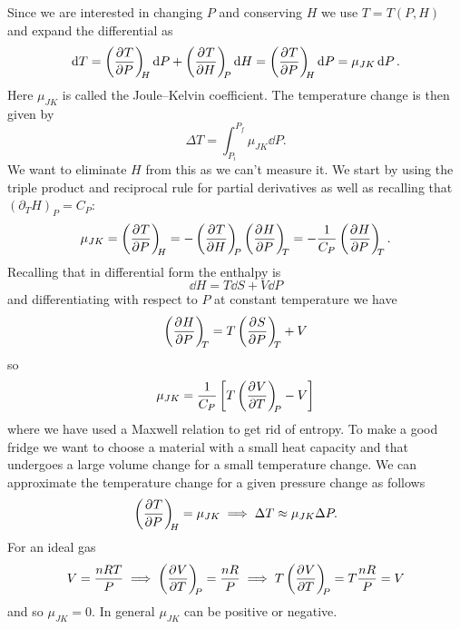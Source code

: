     Since we are interested in changing \(P\) and conserving \(H\) we use \(T = T(P, H)\) and expand the differential as
    \[\dd{T} = \left(\pdv[]{T}{P}\right)_{\!\!{H}}\dd{P} + \left(\pdv[]{T}{H}\right)_{\!\!{P}}\dd{H} = \left(\pdv[]{T}{P}\right)_{\!\!{H}}\dd{P} = \mu_{JK}\dd{P}.\]
    Here \(\mu_{JK}\) is called the Joule--Kelvin coefficient.
    The temperature change is then given by
    \[\Delta T = \int_{P_i}^{P_f}\mu_{JK}\dd{P}.\]
    We want to eliminate \(H\) from this as we can't measure it.
    We start by using the triple product and reciprocal rule for partial derivatives as well as recalling that \((\partial_TH)_P = C_P\):
    \[\mu_{JK} = \pdvconst{T}{P}{H} = -\pdvconst{T}{H}{P}\pdvconst{H}{P}{T} = -\frac{1}{C_P}\pdvconst{H}{P}{T}.\]
    Recalling that in differential form the enthalpy is
    \[\dd{H} = T\dd{S} + V\dd{P}\]
    and differentiating with respect to \(P\) at constant temperature we have
    \[\left(\pdv[]{H}{P}\right)_{\!\!{T}} = T\left(\pdv[]{S}{P}\right)_{\!\!{T}} + V\]
    so
    \[\mu_{JK} = \frac{1}{C_P}\left[T\left(\pdv[]{V}{T}\right)_{\!\!{P}} - V\right]\]
    where we have used a Maxwell relation to get rid of entropy.
    To make a good fridge we want to choose a material with a small heat capacity and that undergoes a large volume change for a small temperature change.
    We can approximate the temperature change for a given pressure change as follows
    \[\left(\pdv[]{T}{P}\right)_{\!\!{H}} = \mu_{JK} \implies \Delta T \approx \mu_{JK}\Delta P.\]
    For an ideal gas
    \[V = \frac{nRT}{P} \implies \left(\pdv[]{V}{T}\right)_{\!\!{P}} = \frac{nR}{P} \implies T\left(\pdv[]{V}{T}\right)_{\!\!{P}} = T\frac{nR}{P} = V\]
    and so \(\mu_{JK} = 0\).
    In general \(\mu_{JK}\) can be positive or negative.
    
